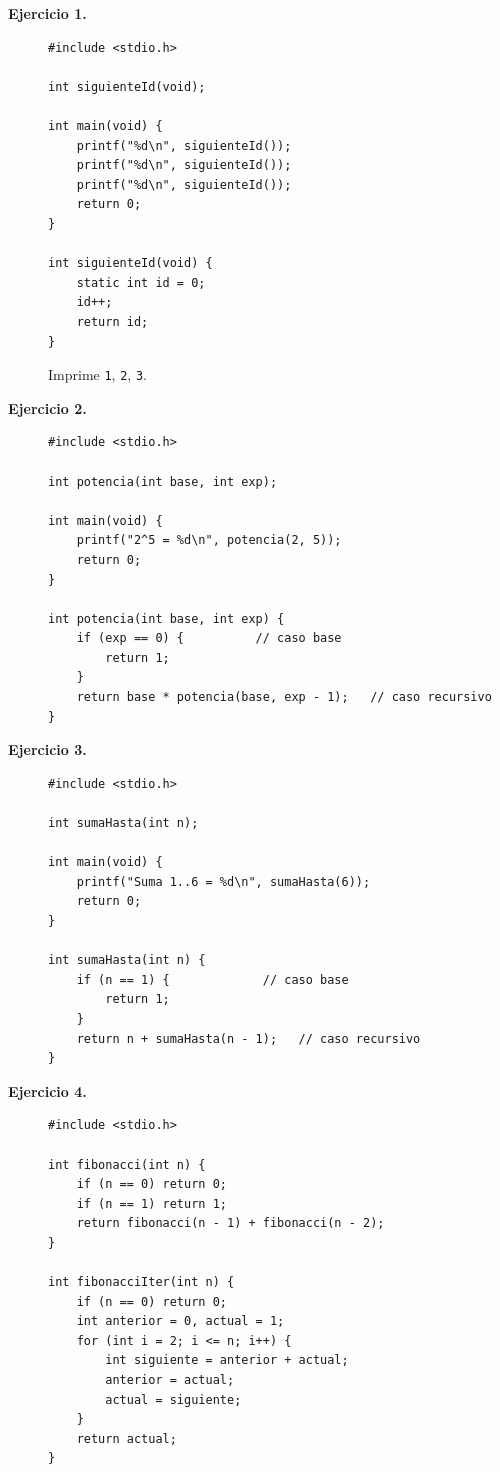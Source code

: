 \documentclass[11pt,letterpaper]{article}
\theoremstyle{definition}
\begin{document}
\begin{description}

\item[\textbf{Ejercicio 1.}]
\begin{lstlisting}
#include <stdio.h>

int siguienteId(void);

int main(void) {
    printf("%d\n", siguienteId());
    printf("%d\n", siguienteId());
    printf("%d\n", siguienteId());
    return 0;
}

int siguienteId(void) {
    static int id = 0;
    id++;
    return id;
}
\end{lstlisting}
Imprime \texttt{1}, \texttt{2}, \texttt{3}.

\item[\textbf{Ejercicio 2.}]
\begin{lstlisting}
#include <stdio.h>

int potencia(int base, int exp);

int main(void) {
    printf("2^5 = %d\n", potencia(2, 5));
    return 0;
}

int potencia(int base, int exp) {
    if (exp == 0) {          // caso base
        return 1;
    }
    return base * potencia(base, exp - 1);   // caso recursivo
}
\end{lstlisting}

\item[\textbf{Ejercicio 3.}]
\begin{lstlisting}
#include <stdio.h>

int sumaHasta(int n);

int main(void) {
    printf("Suma 1..6 = %d\n", sumaHasta(6));
    return 0;
}

int sumaHasta(int n) {
    if (n == 1) {             // caso base
        return 1;
    }
    return n + sumaHasta(n - 1);   // caso recursivo
}
\end{lstlisting}

\item[\textbf{Ejercicio 4.}]
\begin{lstlisting}
#include <stdio.h>

int fibonacci(int n) {
    if (n == 0) return 0;
    if (n == 1) return 1;
    return fibonacci(n - 1) + fibonacci(n - 2);
}

int fibonacciIter(int n) {
    if (n == 0) return 0;
    int anterior = 0, actual = 1;
    for (int i = 2; i <= n; i++) {
        int siguiente = anterior + actual;
        anterior = actual;
        actual = siguiente;
    }
    return actual;
}


\end{lstlisting}
\end{description}
\end{document}
